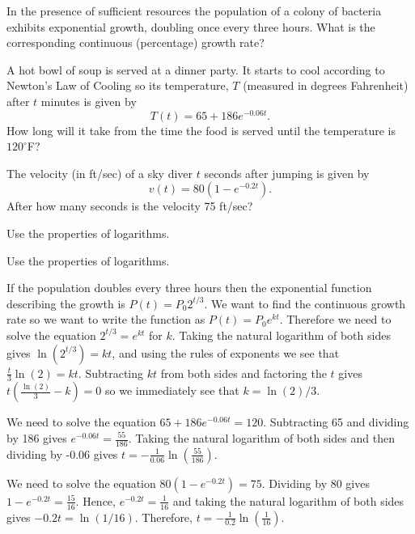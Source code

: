 \begin{activity}\label{A:0.4.4}
\ba
\item In the presence of sufficient resources the population of a colony of bacteria exhibits exponential growth, doubling once every three hours. What is the corresponding continuous (percentage) growth rate?
\item A hot bowl of soup is served at a dinner party.  It starts to cool according to
    Newton's Law of Cooling so its temperature, $T$ (measured in degrees Fahrenheit) after
    $t$ minutes is given by
    \[ T(t) = 65 + 186 e^{-0.06t}. \]
    How long will it take from the time the food is served until the temperature is
    $120^\circ$F?
\item The velocity (in ft/sec) of a sky diver $t$ seconds after jumping is given by 
    \[ v(t) = 80\left( 1-e^{-0.2t} \right). \]
    After how many seconds is the velocity 75 ft/sec?
\ea
\end{activity}
\begin{smallhint}
    Use the properties of logarithms.
\end{smallhint}
\begin{bighint}
    Use the properties of logarithms.
\end{bighint}
\begin{activitySolution}
    \ba
        \item If the population doubles every three hours then the exponential function
            describing the growth is $P(t) = P_0 2^{t/3}$.  We want to find the continuous
            growth rate so we want to write the function as $P(t) = P_0 e^{kt}$.
            Therefore we need to solve the equation $2^{t/3} = e^{kt}$ for $k$.  Taking
            the natural logarithm of both sides gives
            $\ln \left( 2^{t/3} \right) = kt$, and using the rules of exponents we see
            that $\frac{t}{3} \ln(2) = kt$.  Subtracting $kt$ from both sides and
            factoring the $t$ gives $t\left( \frac{\ln(2)}{3} - k \right) = 0$ so we
            immediately see that $k = \ln(2)/3$.
        \item We need to solve the equation $65+186e^{-0.06t} = 120$.  Subtracting 65 and
            dividing by 186 gives $e^{-0.06t} = \frac{55}{186}$.  Taking the natural
            logarithm of both sides and then dividing by -0.06 gives $t =
            -\frac{1}{0.06} \ln \left( \frac{55}{186} \right)$.
        \item We need to solve the equation $80\left( 1-e^{-0.2t} \right) = 75$.  Dividing
            by 80 gives $1-e^{-0.2t} = \frac{15}{16}$.  Hence, $e^{-0.2t} =
            \frac{1}{16}$ and taking the natural logarithm of both sides gives $-0.2t =
            \ln(1/16)$.  Therefore, $t = -\frac{1}{0.2} \ln\left( \frac{1}{16} \right)$.
    \ea
\end{activitySolution}

\aftera
